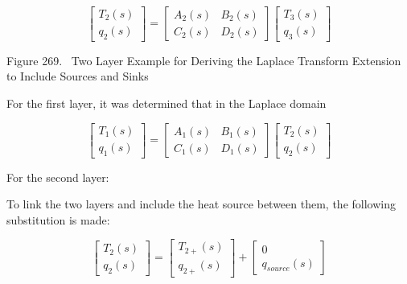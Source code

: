 \begin{equation}
\left[ {\begin{array}{*{20}{c}}{{T_2}\left( s \right)}\\ {{q_2}\left( s \right)}\end{array}} \right] = \left[ {\begin{array}{*{20}{c}}{{A_2}\left( s \right)}&{{B_2}\left( s \right)}\\ {{C_2}\left( s \right)}&{{D_2}\left( s \right)}\end{array}} \right]\left[ {\begin{array}{*{20}{c}}{{T_3}\left( s \right)}\\ {{q_3}\left( s \right)}\end{array}} \right]
\end{equation}

Figure 269.~ Two Layer Example for Deriving the Laplace Transform Extension to Include Sources and Sinks

For the first layer, it was determined that in the Laplace domain

\begin{equation}
\left[ {\begin{array}{*{20}{c}}{{T_1}\left( s \right)}\\ {{q_1}\left( s \right)}\end{array}} \right] = \left[ {\begin{array}{*{20}{c}}{{A_1}\left( s \right)}&{{B_1}\left( s \right)}\\ {{C_1}\left( s \right)}&{{D_1}\left( s \right)}\end{array}} \right]\left[ {\begin{array}{*{20}{c}}{{T_2}\left( s \right)}\\ {{q_2}\left( s \right)}\end{array}} \right]
\end{equation}

For the second layer:

To link the two layers and include the heat source between them, the following substitution is made:

\begin{equation}
\left[ {\begin{array}{*{20}{c}}{{T_2}\left( s \right)}\\ {{q_2}\left( s \right)}\end{array}} \right] = \left[ {\begin{array}{*{20}{c}}{{T_{2 + }}\left( s \right)}\\ {{q_{2 + }}\left( s \right)}\end{array}} \right] + \left[ {\begin{array}{*{20}{c}}0\\ {{q_{source}}\left( s \right)}\end{array}} \right]
\end{equation}

